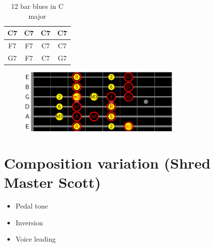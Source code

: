 \documentclass{article}
\begin{document}
\begin{table}[!h]
	\caption{12 bar blues in C major}
	\centering
	\begin{tabular}{| c | c | c | c |}
		\hline
		\phantom{x}C7\phantom{x} & \phantom{x}C7\phantom{x} & \phantom{x}C7\phantom{x} & \phantom{x}C7\phantom{x}  \\ 
		\hline
		\phantom{x}F7\phantom{x} & \phantom{x}F7\phantom{x} & \phantom{x}C7\phantom{x} & \phantom{x}C7\phantom{x}  \\ 
		\hline
		\phantom{x}G7\phantom{x} & \phantom{x}F7\phantom{x} & \phantom{x}C7\phantom{x} & \phantom{x}G7\phantom{x}  \\ 
		\hline
	\end{tabular}
	\label{tab: }
\end{table}

\begin{figure}[h!]
	\centering
	\hspace*{-1cm}
	\includegraphics[width=8cm, trim= {0cm 0cm 0cm 0cm}, clip]{Blues/main.pdf}
	\caption{ }
	\label{fig}
\end{figure}

\newpage
\section{Composition variation (Shred Master Scott)}

\begin{itemize}
	\item Pedal tone
	\item Inversion
	\item Voice leading
\end{itemize}

\newpage


\end{document}
